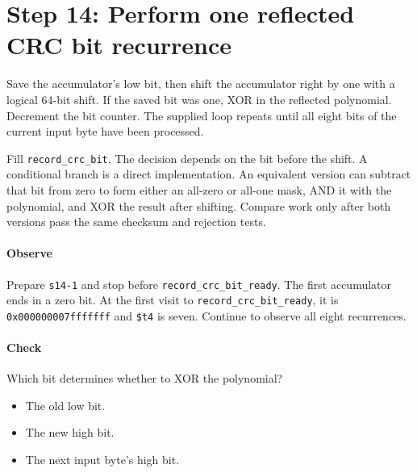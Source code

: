 \section{Step 14: Perform one reflected CRC bit recurrence}
Save the accumulator's low bit, then shift the accumulator right by one
with a logical 64-bit shift. If the saved bit was one, XOR in the reflected
polynomial. Decrement the bit counter. The supplied loop repeats until all eight
bits of the current input byte have been processed.

Fill \texttt{record\_crc\_bit}. The decision depends on the bit before the
shift. A conditional branch is a direct implementation. An equivalent version
can subtract that bit from zero to form either an all-zero or all-one mask, AND
it with the polynomial, and XOR the result after shifting. Compare work only
after both versions pass the same checksum and rejection tests.

\paragraph{Observe} Prepare \texttt{s14-1} and stop before
\texttt{record\_crc\_bit\_ready}. The first accumulator ends in a zero bit. At the first visit to
\texttt{record\_crc\_bit\_ready}, it is \texttt{0x000000007fffffff} and
\texttt{\$t4} is seven. Continue to observe all eight recurrences.

\paragraph{Check} Which bit determines whether to XOR the polynomial?
\begin{itemize}
  \item[A.] The old low bit.
  \item[B.] The new high bit.
  \item[C.] The next input byte's high bit.
\end{itemize}
